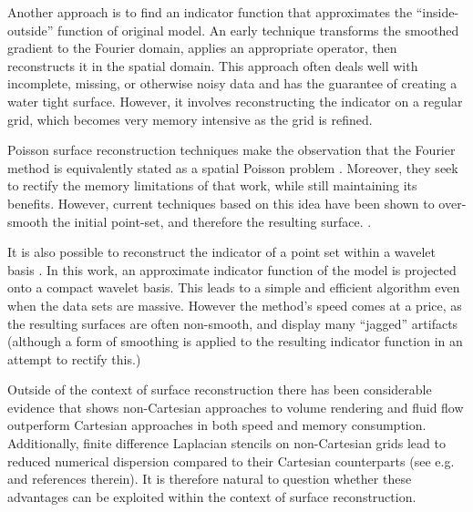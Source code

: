 Another approach is to find an indicator function that approximates the
``inside-outside'' function of original model. An early technique \cite{fftk} 
transforms the smoothed gradient to the Fourier domain, applies an appropriate 
operator, then reconstructs it in the spatial domain. This approach often deals well with
incomplete, missing, or otherwise noisy data and has the guarantee of
creating a water tight surface. However, it involves reconstructing
the indicator on a regular grid, which becomes very memory intensive
as the grid is refined.

Poisson surface reconstruction techniques make the observation that
the Fourier method is equivalently stated as a spatial Poisson problem
\cite{Kazhdan06,screenedk}. Moreover, they seek to rectify the memory
limitations of that work, while still maintaining its benefits. However, 
current techniques based on this idea have been shown to over-smooth 
the initial point-set, and therefore the resulting surface. \cite{reconbench}.

It is also possible to reconstruct the indicator of a point set within
a wavelet basis \cite{wavelet}. In this work, an approximate indicator
function of the model is projected onto a compact wavelet basis. This
leads to a simple and efficient algorithm even when the data sets
are massive. However the method's speed comes at a price, as the
resulting surfaces are often non-smooth, and display many ``jagged''
artifacts (although a form of smoothing is applied to the resulting
indicator function in an attempt to rectify this.)

Outside of the context of surface reconstruction there has been considerable
evidence that shows non-Cartesian approaches to volume rendering 
\cite{firstbox, practicalbox, hvolrecon} and fluid flow \cite{lboltzman} outperform 
Cartesian approaches in both speed and memory consumption. Additionally, 
finite difference Laplacian stencils on non-Cartesian grids lead to reduced 
numerical dispersion compared to their Cartesian  counterparts (see e.g. 
\cite{hamilton2013, hamilton2013hexagonal} and references therein). It is 
therefore natural to question whether these advantages can be exploited 
within the context of surface reconstruction.

